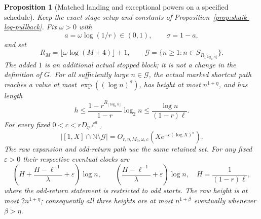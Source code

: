 \documentclass[11pt]{article}
\newtheorem{proposition}{Proposition}
\theoremstyle{remark}\newtheorem{remark}[proposition]{Remark}
\newcommand{\NN}{\mathbb N}
\begin{document}
\begin{proposition}[Matched landing and exceptional powers on a specified schedule]
\label{prop:shaik-matched-schedule}
Keep the exact stage setup and constants of
Proposition~\ref{prop:shaik-log-pullback}. Fix \(\omega>0\) with
\[
 a=\omega\log(1/r)\in(0,1),\qquad \sigma=1-a,
\]
and set
\begin{equation}\label{eq:shaik-matched-depth}
 R_M=\lfloor\omega\log(M+4)\rfloor+1,\qquad
 \mathcal G=\{n\ge1:n\in S_{R_{\lfloor\log_2n\rfloor}}\}.
\end{equation}
The added \(1\) is an additional actual stopped block; it is not a
change in the definition of \(G\).
For all sufficiently large \(n\in\mathcal G\), the actual marked
shortcut path reaches a value at most
\(\exp((\log n)^\sigma)\), has height at most \(n^{1+\eta}\), and
has length
\begin{equation}\label{eq:shaik-matched-clock}
 h\le \frac{1-r^{R_{\lfloor\log_2n\rfloor}}}{1-r}\log_2n
       \le\frac{\log n}{(1-r)\ell}.
\end{equation}
For every fixed \(0<c<rD_\eta\ell^a\),
\begin{equation}\label{eq:shaik-matched-rate}
 |[1,X]\cap\NN\setminus\mathcal G|
 =O_{r,\eta,M_0,\omega,c}
       \left(Xe^{-c(\log X)^\sigma}\right).
\end{equation}
The raw expansion and odd-return path use the same retained set.
For any fixed \(\varepsilon>0\) their respective eventual clocks are
\[
 \left(H+\frac{H-\ell^{-1}}{\lambda}+\varepsilon\right)\log n,
 \qquad
 \left(\frac{H-\ell^{-1}}{\lambda}+\varepsilon\right)\log n,
 \quad H=\frac1{(1-r)\ell},
\]
where the odd-return statement is restricted to odd starts.
The raw height is at most \(2n^{1+\eta}\); consequently all three
heights are at most \(n^{1+\beta}\) eventually whenever \(\beta>\eta\).
\end{proposition}
\end{document}
